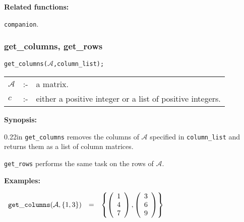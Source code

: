 \vspace*{3mm}

{\bf Related functions:}

\hspace*{0.175in} {\tt companion}.

\subsubsection{get\_columns, get\_rows}
\label{linalg:get_columns}


\hspace*{0.175in} {\tt get\_columns($\mathcal{A}$,column\_list);}

\hspace*{0.1in} 
\begin{tabular}{l l l}
$\mathcal{A}$ &:-& a matrix. \\
$c$          &:-& either a positive integer or a list of positive 
                integers.
\end{tabular}

{\bf Synopsis:} %

\begin{addtolength}{\leftskip}{0.22in}
{\tt get\_columns} removes the columns of $\mathcal{A}$ specified in 
                \texttt{column\_list} and returns them as a list of column 
                matrices. 

\end{addtolength}
\hspace*{0.175in} {\tt get\_rows} performs the same task on the rows of 
                $\mathcal{A}$. 

{\bf Examples:}

\begin{flushleft}  
\hspace*{0.1in}
\begin{math}  
\begin{array}{ccc}
{\tt get\_columns}(\mathcal{A},\{1,3\}) & = & 
\left\{ 
        \left( \begin{array}{c} 1 \\ 4 \\ 7 \end{array} \right),
        \left( \begin{array}{c} 3 \\ 6 \\ 9 \end{array} \right) 
\right\} 
\end{array}
\end{math}  
\end{flushleft}

